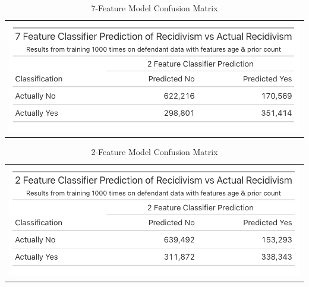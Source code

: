 \documentclass[12pt, ]{article}
\begin{document}
\hypertarget{tbl-5}{}
\begin{longtable}[]{@{}l@{}}
\caption{\label{tbl-5}7-Feature Model Confusion Matrix}\tabularnewline
\toprule\noalign{}
\endfirsthead
\endhead
\bottomrule\noalign{}
\endlastfoot
\includegraphics{tables/tbl5.png} \\
\end{longtable}

\hypertarget{tbl-6}{}
\begin{longtable}[]{@{}l@{}}
\caption{\label{tbl-6}2-Feature Model Confusion Matrix}\tabularnewline
\toprule\noalign{}
\endfirsthead
\endhead
\bottomrule\noalign{}
\endlastfoot
\includegraphics{tables/tbl6.png} \\
\end{longtable}
\end{document}
